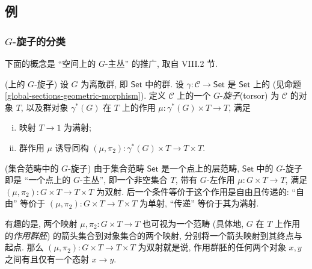 \subsection{例}

\subsubsection{$G$-旋子的分类\topos{}}


下面的概念是 ``空间上的 $G$-主丛'' 的推广, 取自 \cite{SGL} VIII.2 节.
\begin{definition}
	[label={G-torsors-over-topos}]
	{(\topos{}上的 $G$-旋子)}
	设 $G$ 为离散群, 即 $\mathsf {Set}$ 中的群.
	设 $\gamma\colon \mathcal C\to \mathsf {Set}$ 是 $\mathsf {Set}$ 上的\topos{} (见命题 \ref{global-sections-geometric-morphism}). 定义 $\mathcal C$ 上的一个 $G$-\emph{旋子}\footnotemark (torsor) 为 $\mathcal C$ 的对象 $T$, 以及群对象 $\gamma^*(G)$ 在 $T$ 上的作用 $\mu\colon \gamma^*(G)\times T \to T$, 满足
	\begin{enumerate}[(i)]
		\item 映射 $T\to 1$ 为满射;
		\item 群作用 $\mu$ 诱导同构 $(\mu,\pi_2)\colon \gamma^*(G)\times T \to T\times T$.
	\end{enumerate}
\end{definition}

%	

\begin{example}
	{(集合范畴中的 $G$-旋子)}
	由于集合范畴 $\mathsf {Set}$ 是一个点上的层范畴,
	$\mathsf {Set}$ 中的 $G$-旋子即是 ``一个点上的 $G$-主丛'',
	即一个非空集合 $T$, 带有 $G$-左作用 $\mu\colon G\times T \to T$, 满足 $(\mu,\pi_2)\colon G\times T \to T\times T$ 为双射.
	后一个条件等价于这个作用是自由且传递的:
	``自由'' 等价于 $(\mu,\pi_2)\colon G\times T \to T\times T$ 为单射, ``传递'' 等价于其为满射.
	
	有趣的是, 两个映射 $\mu,\pi_2\colon G\times T \to T$ 也可视为一个范畴 (具体地, $G$ 在 $T$ 上作用的\emph{作用群胚}) 的箭头集合到对象集合的两个映射, 分别将一个箭头映射到其终点与起点. 那么 $(\mu,\pi_2)\colon G\times T \to T\times T$ 为双射就是说, 作用群胚的任何两个对象 $x,y$ 之间有且仅有一个态射 $x\to y$.
\end{example}

